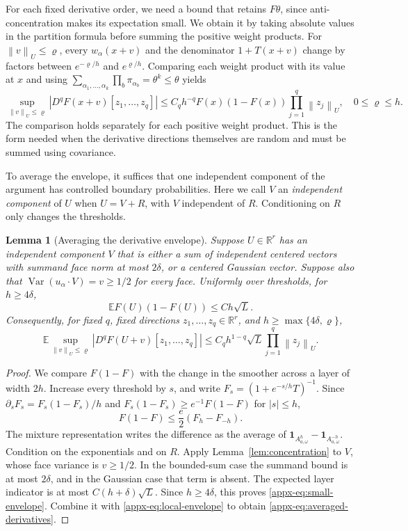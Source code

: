 \documentclass[11pt,letterpaper]{article}
\newtheorem{lemma}{Lemma}
\theoremstyle{remark}
\newcommand{\E}{\mathbb E}
\newcommand{\R}{\mathbb R}
\newcommand{\Var}{\operatorname{Var}}
\newcommand{\norm}[1]{\left\lVert#1\right\rVert}
\newcommand{\ind}{\mathbf 1}
\begin{document}
For each fixed derivative order, we need a bound that retains
\(F\theta\), since anti-concentration makes its expectation small.
We obtain it by taking absolute values in the partition formula
before summing the positive weight products.
For \(\norm v_U\le\varrho\), every \(w_\alpha(x+v)\) and the
denominator \(1+T(x+v)\) change by factors between
\(e^{-\varrho/h}\) and \(e^{\varrho/h}\). Comparing each weight
product with its value at \(x\) and using
\(\sum_{\alpha_1,\ldots,\alpha_k}\prod_b\pi_{\alpha_b}
=\theta^k\le\theta\) yields
\begin{equation}
 \sup_{\norm v_U\le\varrho}|D^qF(x+v)[z_1,\ldots,z_q]|
 \le C_qh^{-q}F(x)(1-F(x))\prod_{j=1}^q\norm{z_j}_U,
 \quad 0\le\varrho\le h.
 \label{appx-eq:local-envelope}
\end{equation}
The comparison holds separately for each positive weight product.
This is the form needed when the derivative directions themselves
are random and must be summed using covariance.

To average the envelope, it suffices that one independent component
of the argument has controlled boundary probabilities. Here we call
\(V\) an \emph{independent component} of \(U\) when \(U=V+R\), with
\(V\) independent of \(R\). Conditioning on \(R\) only changes the thresholds.
\begin{lemma}[Averaging the derivative envelope]\label{appx-lem:envelope}
Suppose \(U\in\R^r\) has an independent component \(V\) that is
either a sum of independent centered vectors with summand face norm
at most \(2\delta\), or a centered Gaussian vector. Suppose also
that \(\Var(u_\alpha\cdot V)=v\ge1/2\) for every face.
Uniformly over thresholds, for \(h\ge4\delta\),
\begin{equation}
 \E F(U)(1-F(U))\le Ch\sqrt L.
 \label{appx-eq:small-envelope}
\end{equation}
Consequently, for fixed \(q\), fixed directions
\(z_1,\ldots,z_q\in\R^r\), and \(h\ge\max\{4\delta,\varrho\}\),
\begin{equation}
 \E\sup_{\norm v_U\le\varrho}|D^qF(U+v)[z_1,\ldots,z_q]|
 \le C_qh^{1-q}\sqrt L\prod_{j=1}^q\norm{z_j}_U.
 \label{appx-eq:averaged-derivatives}
\end{equation}
\end{lemma}

\begin{proof}
We compare \(F(1-F)\) with the change in the smoother across a layer
of width \(2h\). Increase every threshold by \(s\), and write
\(F_s=(1+e^{-s/h}T)^{-1}\). Since
\(\partial_sF_s=F_s(1-F_s)/h\) and
\(F_s(1-F_s)\ge e^{-1}F(1-F)\) for \(|s|\le h\),
\[
 F(1-F)\le\frac e2(F_h-F_{-h}).
\]
The mixture representation writes the difference as the average of
\(\ind_{A_{a,\omega}^h}-\ind_{A_{a,\omega}^{-h}}\).
Condition on the exponentials and on \(R\). Apply
Lemma~\ref{lem:concentration} to \(V\), whose face variance is
\(v\ge1/2\). In the bounded-sum case the summand bound is at most
\(2\delta\), and in the Gaussian case that term is absent. The expected
layer indicator is at most \(C(h+\delta)\sqrt L\). Since \(h\ge4\delta\), this proves
\eqref{appx-eq:small-envelope}. Combine it with
\eqref{appx-eq:local-envelope} to obtain
\eqref{appx-eq:averaged-derivatives}.
\end{proof}
\end{document}

